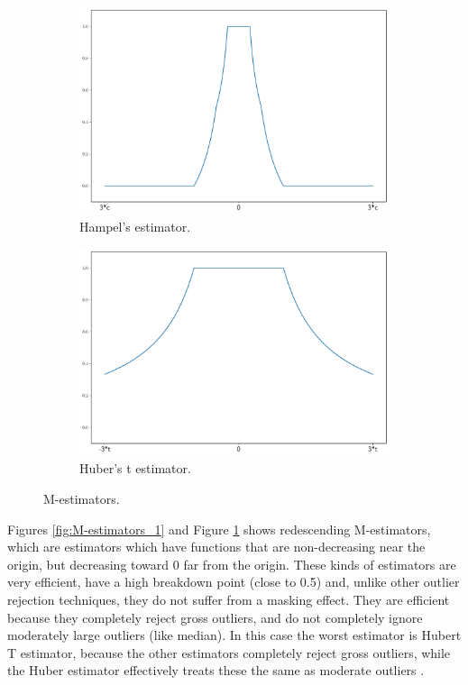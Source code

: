 \documentclass[11pt]{article}
\theoremstyle{definition}
\theoremstyle{remark}
\theoremstyle{remark}
\begin{document}
\begin{figure}[H]
  \centering
  \begin{subfigure}[t]{0.475\textwidth}
      \centering
      \includegraphics[scale=0.20]{../figs/Hampel.pdf}
      \caption{Hampel’s estimator.}
  \end{subfigure}
  \begin{subfigure}[t]{0.475\textwidth}
      \centering
      \includegraphics[scale=0.20]{../figs/HuberT.pdf}
      \caption{Huber’s t estimator.}
    \end{subfigure}
  \caption{M-estimators.}
  \label{fig:M-estimators_2}
\end{figure}

Figures \ref{fig:M-estimators_1} and Figure \ref{fig:M-estimators_2}
shows redescending M-estimators, which are estimators which have
functions that are non-decreasing near the origin, but decreasing
toward 0 far from the origin. These kinds of estimators are very
efficient, have a high breakdown point (close to 0.5) and, unlike
other outlier rejection techniques, they do not suffer from a masking
effect. They are efficient because they completely reject gross
outliers, and do not completely ignore moderately large outliers (like
median). In this case the worst estimator is Hubert T estimator,
because the other estimators completely reject gross outliers, while
the Huber estimator effectively treats these the same as moderate
outliers \cite{susanti2014m}.
\end{document}
